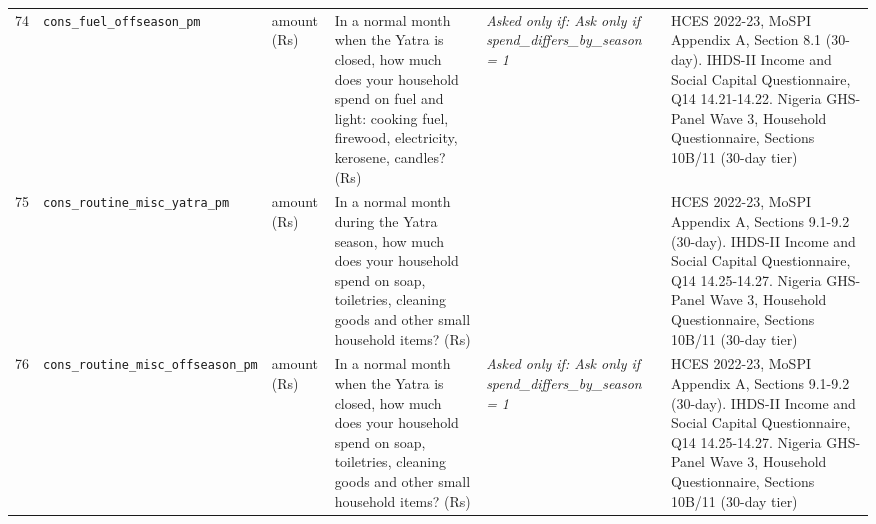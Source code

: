 \documentclass[9pt,a4paper,landscape]{article}
\begin{document}
\begin{longtable}{@{}p{0.5cm}p{3.3cm}p{1.7cm}p{7.3cm}p{5.6cm}p{5.4cm}@{}}
\footnotesize 74 & \footnotesize\texttt{cons\_fuel\_offseason\_pm} & \scriptsize amount (Rs) & \footnotesize In a normal month when the Yatra is closed, how much does your household spend on fuel and light: cooking fuel, firewood, electricity, kerosene, candles? (Rs)\par\vspace{1pt}{\footnotesize\color{hdr}{\hifont जब यात्रा बंद रहती है, उस आम महीने में आपका घर ईंधन और रोशनी पर: खाना बनाने की गैस, लकड़ी, बिजली, मिट्टी का तेल, मोमबत्ती कितना ख़र्च करता है? (रुपये)}} & \scriptsize \textit{Asked only if: Ask only if spend\_differs\_by\_season = 1} & \scriptsize HCES 2022-23, MoSPI Appendix A, Section 8.1 (30-day). IHDS-II Income and Social Capital Questionnaire, Q14 14.21-14.22. Nigeria GHS-Panel Wave 3, Household Questionnaire, Sections 10B/11 (30-day tier)\\
\footnotesize 75 & \footnotesize\texttt{cons\_routine\_misc\_yatra\_pm} & \scriptsize amount (Rs) & \footnotesize In a normal month during the Yatra season, how much does your household spend on soap, toiletries, cleaning goods and other small household items? (Rs)\par\vspace{1pt}{\footnotesize\color{hdr}{\hifont यात्रा के मौसम के आम महीने में, आप (और जो यहाँ आपके साथ रहते हैं) साबुन, नहाने-धोने का सामान, सफ़ाई का सामान और घर की दूसरी छोटी चीज़ों पर कितना ख़र्च करते हैं? (रुपये)}} & \scriptsize  & \scriptsize HCES 2022-23, MoSPI Appendix A, Sections 9.1-9.2 (30-day). IHDS-II Income and Social Capital Questionnaire, Q14 14.25-14.27. Nigeria GHS-Panel Wave 3, Household Questionnaire, Sections 10B/11 (30-day tier)\\
\footnotesize 76 & \footnotesize\texttt{cons\_routine\_misc\_offseason\_pm} & \scriptsize amount (Rs) & \footnotesize In a normal month when the Yatra is closed, how much does your household spend on soap, toiletries, cleaning goods and other small household items? (Rs)\par\vspace{1pt}{\footnotesize\color{hdr}{\hifont जब यात्रा बंद रहती है, उस आम महीने में आपका घर साबुन, नहाने-धोने का सामान, सफ़ाई का सामान और घर की दूसरी छोटी चीज़ों पर कितना ख़र्च करता है? (रुपये)}} & \scriptsize \textit{Asked only if: Ask only if spend\_differs\_by\_season = 1} & \scriptsize HCES 2022-23, MoSPI Appendix A, Sections 9.1-9.2 (30-day). IHDS-II Income and Social Capital Questionnaire, Q14 14.25-14.27. Nigeria GHS-Panel Wave 3, Household Questionnaire, Sections 10B/11 (30-day tier)\\

\end{longtable}
\end{document}
